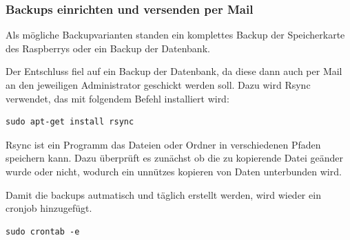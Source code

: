 \documentclass[11pt,a4paper]{article} %
\begin{document}
\subsubsection{Backups einrichten und versenden per Mail}
Als m\"ogliche Backupvarianten standen ein komplettes Backup der Speicherkarte des Raspberrys oder ein Backup der Datenbank.
\par
Der Entschluss fiel auf ein Backup der Datenbank, da diese dann auch per Mail an den jeweiligen Administrator geschickt werden soll. Dazu wird Rsync verwendet, das mit folgendem Befehl installiert wird:
\begin{frame}

\begin{lstlisting}
sudo apt-get install rsync
\end{lstlisting}
\end{frame}
 Rsync ist ein Programm das Dateien oder Ordner in verschiedenen Pfaden speichern kann. Dazu \"uberpr\"uft es zun\"achst ob die zu kopierende Datei ge\"ander wurde oder nicht, wodurch ein unn\"utzes kopieren von Daten unterbunden wird.
\par
Damit die backups autmatisch und t\"aglich erstellt werden, wird wieder ein cronjob hinzugef\"ugt.
\begin{frame}

\begin{lstlisting}
sudo crontab -e
\end{lstlisting}
\end{frame}
\end{document}
